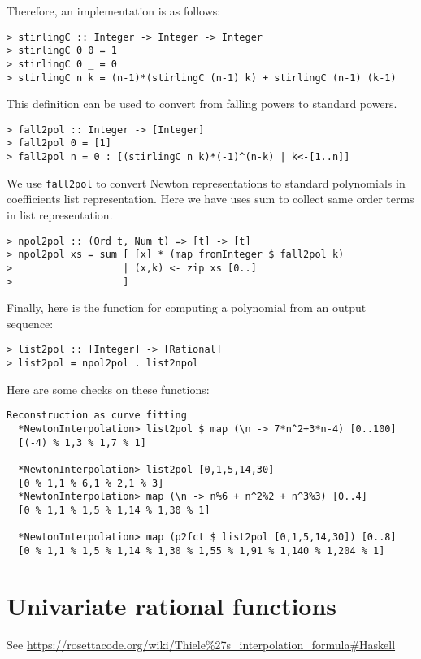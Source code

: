 \documentclass[11pt]{book}
\begin{document}
Therefore, an implementation is as follows:
\begin{verbatim}
> stirlingC :: Integer -> Integer -> Integer
> stirlingC 0 0 = 1
> stirlingC 0 _ = 0
> stirlingC n k = (n-1)*(stirlingC (n-1) k) + stirlingC (n-1) (k-1)
\end{verbatim}
This definition can be used to convert from falling powers to standard powers.
\begin{verbatim}
> fall2pol :: Integer -> [Integer]
> fall2pol 0 = [1]
> fall2pol n = 0 : [(stirlingC n k)*(-1)^(n-k) | k<-[1..n]]
\end{verbatim}
We use \texttt{fall2pol} to convert Newton representations to standard polynomials in coefficients list representation.
Here we have uses sum to collect same order terms in list representation.
\begin{verbatim}
> npol2pol :: (Ord t, Num t) => [t] -> [t]
> npol2pol xs = sum [ [x] * (map fromInteger $ fall2pol k)
>                   | (x,k) <- zip xs [0..]
>                   ]
\end{verbatim}
Finally, here is the function for computing a polynomial from an output sequence:
\begin{verbatim}
> list2pol :: [Integer] -> [Rational]
> list2pol = npol2pol . list2npol
\end{verbatim}
Here are some checks on these functions:
\begin{verbatim}
Reconstruction as curve fitting
  *NewtonInterpolation> list2pol $ map (\n -> 7*n^2+3*n-4) [0..100]
  [(-4) % 1,3 % 1,7 % 1]

  *NewtonInterpolation> list2pol [0,1,5,14,30]
  [0 % 1,1 % 6,1 % 2,1 % 3]
  *NewtonInterpolation> map (\n -> n%6 + n^2%2 + n^3%3) [0..4]
  [0 % 1,1 % 1,5 % 1,14 % 1,30 % 1]

  *NewtonInterpolation> map (p2fct $ list2pol [0,1,5,14,30]) [0..8]
  [0 % 1,1 % 1,5 % 1,14 % 1,30 % 1,55 % 1,91 % 1,140 % 1,204 % 1]

\end{verbatim}















\section{Univariate rational functions}
See \url{https://rosettacode.org/wiki/Thiele%27s_interpolation_formula#Haskell}
\end{document}
